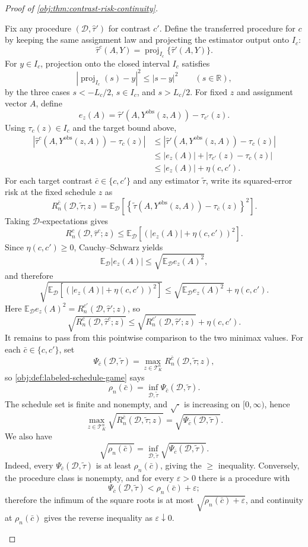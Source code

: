 \begin{proof}[Proof of \cref{obj:thm:contrast-risk-continuity}]
\begin{enumerate}
Fix any procedure \((\mathcal D,\widehat\tau')\) for contrast \(c'\). Define the transferred procedure for \(c\) by keeping the same assignment law and projecting the estimator output onto \(I_c\):
\[
\widehat\tau^{c}(A,Y)=
\operatorname{proj}_{I_c}\{\widehat\tau'(A,Y)\}.
\]
For \(y\in I_c\), projection onto the closed interval \(I_c\) satisfies
\[
\left|\operatorname{proj}_{I_c}(s)-y\right|^2\le |s-y|^2
\qquad(s\in\mathbb R),
\]
by the three cases \(s<-L_c/2\), \(s\in I_c\), and \(s>L_c/2\). For fixed \(z\) and assignment vector \(A\), define
\[
e_z(A)=\widehat\tau'(A,Y^{\mathrm{obs}}(z,A))-\tau_{c'}(z).
\]
Using \(\tau_c(z)\in I_c\) and the target bound above,
\[
\begin{aligned}
\left|\widehat\tau^{c}(A,Y^{\mathrm{obs}}(z,A))-\tau_c(z)\right|
&\le
\left|\widehat\tau'(A,Y^{\mathrm{obs}}(z,A))-\tau_c(z)\right|  \\
&\le
|e_z(A)|+|\tau_{c'}(z)-\tau_c(z)| \\
&\le
|e_z(A)|+\eta(c,c').
\end{aligned}
\]
For each target contrast \(\bar c\in\{c,c'\}\) and any estimator \(\widetilde\tau\), write its squared-error risk at the fixed schedule \(z\) as
\[
R_n^{\bar c}(\mathcal D,\widetilde\tau;z)
=
\mathbb E_{\mathcal D}\left[
\left\{
\widetilde\tau(A,Y^{\mathrm{obs}}(z,A))-\tau_{\bar c}(z)
\right\}^2
\right].
\]
Taking \(\mathcal D\)-expectations gives
\[
R_n^c(\mathcal D,\widehat\tau^c;z)
\le
\mathbb E_{\mathcal D}\left[(|e_z(A)|+\eta(c,c'))^2\right].
\]
Since \(\eta(c,c')\ge0\), Cauchy--Schwarz yields
\[
\mathbb E_{\mathcal D}|e_z(A)|
\le
\sqrt{\mathbb E_{\mathcal D}e_z(A)^2},
\]
and therefore
\[
\sqrt{\mathbb E_{\mathcal D}\left[(|e_z(A)|+\eta(c,c'))^2\right]}
\le
\sqrt{\mathbb E_{\mathcal D}e_z(A)^2}+\eta(c,c').
\]
Here \(\mathbb E_{\mathcal D}e_z(A)^2=R_n^{c'}(\mathcal D,\widehat\tau';z)\), so
\[
\sqrt{R_n^c(\mathcal D,\widehat\tau^c;z)}
\le
\sqrt{R_n^{c'}(\mathcal D,\widehat\tau';z)}+\eta(c,c').
\]
It remains to pass from this pointwise comparison to the two minimax values.  For each \(\bar c\in\{c,c'\}\), set
\[
\Psi_{\bar c}(\mathcal D,\widetilde\tau)
=
\max_{z\in\mathcal T_K^n} R_n^{\bar c}(\mathcal D,\widetilde\tau;z),
\]
so \cref{obj:def:labeled-schedule-game} says
\[
\rho_n(\bar c)=\inf_{\mathcal D,\widetilde\tau}\Psi_{\bar c}(\mathcal D,\widetilde\tau).
\]
The schedule set is finite and nonempty, and \(\sqrt{\cdot}\) is increasing on \([0,\infty)\), hence
\[
\max_{z\in\mathcal T_K^n}\sqrt{R_n^{\bar c}(\mathcal D,\widetilde\tau;z)}
=
\sqrt{\Psi_{\bar c}(\mathcal D,\widetilde\tau)}.
\]
We also have
\[
\sqrt{\rho_n(\bar c)}
=
\inf_{\mathcal D,\widetilde\tau}\sqrt{\Psi_{\bar c}(\mathcal D,\widetilde\tau)}.
\]
Indeed, every \(\Psi_{\bar c}(\mathcal D,\widetilde\tau)\) is at least \(\rho_n(\bar c)\), giving the \(\ge\) inequality. Conversely, the procedure class is nonempty, and for every \(\varepsilon>0\) there is a procedure with
\[
\Psi_{\bar c}(\mathcal D,\widetilde\tau)<\rho_n(\bar c)+\varepsilon;
\]
therefore the infimum of the square roots is at most \(\sqrt{\rho_n(\bar c)+\varepsilon}\), and continuity at \(\rho_n(\bar c)\) gives the reverse inequality as \(\varepsilon\downarrow0\).


\end{enumerate}
\end{proof}
